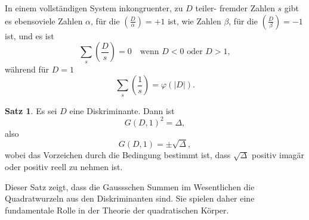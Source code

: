 \documentclass[12pt,a4paper]{article}
\theoremstyle{definition}
\newtheorem*{satz}{Satz}
\begin{document}
In einem vollst\"andigen System inkongruenter, zu $D$ teiler-
fremder Zahlen $s$ gibt es ebensoviele Zahlen $\alpha$, f\"ur die $\left(\frac{D}{\alpha}\right)
= +1$ ist, wie Zahlen $\beta$, f\"ur die $\left(\frac{D}{\beta}\right) = -1$ ist, und es ist
\begin{equation}\tag{12}
\sum_{s} \left(\frac{D}{s}\right) = 0 \quad \text{wenn } D < 0 \text{ oder } D > 1,
\end{equation}
w\"ahrend f\"ur $D = 1$
\begin{equation*}
\sum_{s} \left(\frac{1}{s}\right) = \varphi(|D|).
\end{equation*}

\begin{satz}
Es sei $D$ eine Diskriminante. Dann ist
\begin{equation}\tag{13}
G(D, 1)^2 = \Delta,
\end{equation}
also
\begin{equation*}
G(D, 1) = \pm \sqrt{\Delta},
\end{equation*}
wobei das Vorzeichen durch die Bedingung bestimmt ist, dass
$\sqrt{\Delta}$ positiv imag\"ar oder positiv reell zu nehmen ist.
\end{satz}

Dieser Satz zeigt, dass die Gaussschen Summen im Wesentlichen
die Quadratwurzeln aus den Diskriminanten sind. Sie spielen
daher eine fundamentale Rolle in der Theorie der quadratischen
K\"orper.
\end{document}
